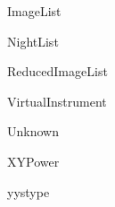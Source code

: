 \begin{CompactList}
\begin{CompactList}
\item Image\-List\begin{CompactList}
\item {}
\item Night\-List\item Reduced\-Image\-List\begin{CompactList}
\item {}
\end{CompactList}
\item {}
\end{CompactList}
\item {}
\end{CompactList}
\item Virtual\-Instrument\begin{CompactList}
\item Unknown\end{CompactList}
\item XYPower\item yystype\end{CompactList}
